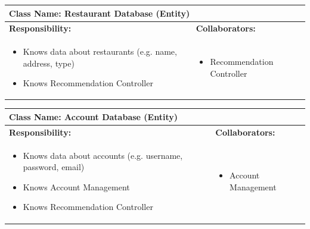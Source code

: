 \documentclass[]{article}
\begin{document}
\begin{table}[H]
	\centering
	\begin{tabular}{|p{7cm}|p{7cm}|}
	\hline 
	 \multicolumn{2}{|l|}{\textbf{Class Name:} Restaurant Database (Entity) }\\
	\hline
	\textbf{Responsibility:} & \textbf{Collaborators:} \\
	\hline
	\raggedright
	\begin{itemize}
		\item Knows data about restaurants (e.g. name, address, type)
		\item Knows Recommendation Controller
	\end{itemize}
	\vspace{1in} & 
	\begin{itemize}
		\item Recommendation Controller
	\end{itemize} \\
	\hline
	\end{tabular}
\end{table}

\begin{table}[H]
	\centering
	\begin{tabular}{|p{7cm}|p{7cm}|}
	\hline 
	 \multicolumn{2}{|l|}{\textbf{Class Name:} Account Database (Entity) }\\
	\hline
	\textbf{Responsibility:} & \textbf{Collaborators:} \\
	\hline
	\raggedright
	\begin{itemize}
		\item Knows data about accounts (e.g. username, password, email)
		\item Knows Account Management
		\item Knows Recommendation Controller
	\end{itemize}
	\vspace{1in} & 
	\begin{itemize}
		\item Account Management
	\end{itemize} \\
	\hline
	\end{tabular}
\end{table}
\end{document}
